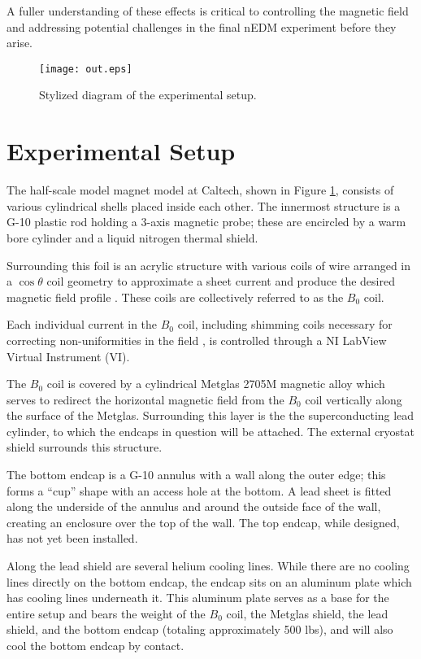 \documentclass[twocolumn,aps,prb,citeautoscript]{revtex4-1}
\begin{document}
A fuller understanding of these effects is critical to
controlling the magnetic field and addressing potential challenges in the
final nEDM experiment before they arise. 

\begin{figure}
\texttt{[image: out.eps]}
\caption{\label{fig:structure}Stylized diagram of the experimental
setup.}
\end{figure}

\section{Experimental Setup}

The half-scale model magnet model at Caltech, shown in
Figure \ref{fig:structure}, consists of various
cylindrical
shells placed inside each other. The innermost structure is 
a G-10 plastic rod holding a 3-axis magnetic probe; these are encircled by a
warm bore cylinder and a liquid nitrogen thermal shield.

Surrounding this foil is
an acrylic structure with various coils of wire arranged in a $\cos\theta$ coil
geometry
to approximate a sheet current and produce the desired magnetic field
profile \cite{coil}.
These coils are collectively referred
to as the $B_0$ coil.

Each individual current in the $B_0$ coil, including shimming coils
necessary for correcting non-uniformities in the field \cite{coil}, is
controlled through a NI LabView Virtual Instrument (VI).

The $B_0$ coil is covered by a cylindrical Metglas 2705M magnetic
alloy which serves to redirect the horizontal magnetic field from the $B_0$
coil vertically along the surface of the Metglas. Surrounding this layer is the
the superconducting lead cylinder, to which the endcaps in
question will be attached. The external cryostat shield surrounds this
structure.

The bottom endcap is a G-10 annulus with a
wall along the outer edge; this forms a ``cup'' shape with an access hole
at the bottom. A lead sheet is fitted along the underside of
the annulus and around the outside face of the wall, creating an enclosure
over the top of the wall. The top endcap, while designed, has not yet been
installed.

Along the lead shield are several helium cooling lines. While there are no
cooling lines directly on the bottom endcap, the endcap sits on an aluminum
plate which has cooling lines underneath it. This aluminum plate serves
as a base for the entire setup and bears the weight of the $B_0$ coil, the
Metglas shield, the lead shield, and the bottom endcap
(totaling approximately 500 lbs), and will also cool
the bottom endcap by contact.
\end{document}
